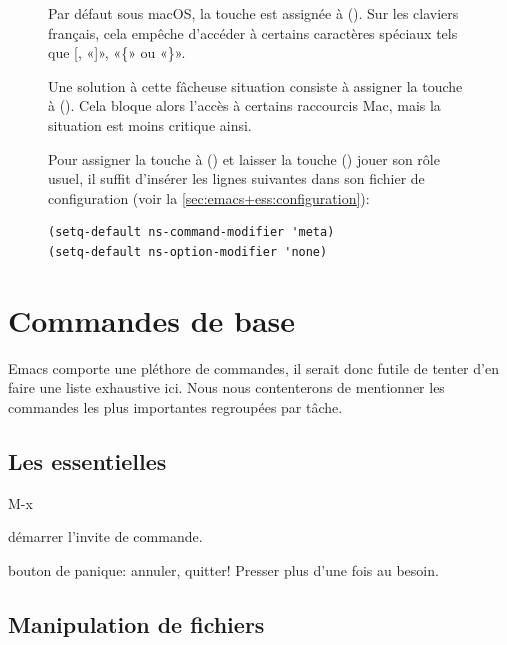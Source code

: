 \begin{figure}[t]
  \label{fig:ess:meta}
  \begin{osxblock}
    Par défaut sous macOS, la touche  est assignée à
     (\optkey). Sur les claviers français, cela empêche
    d'accéder à certains caractères spéciaux tels que {\og}[{\fg},
    «]», «\{» ou «\}».

    Une solution à cette fâcheuse situation consiste à assigner la
    touche  à  (\cmdkey). Cela bloque alors
    l'accès à certains raccourcis Mac, mais la situation est moins
    critique ainsi.

    Pour assigner la touche  à  (\cmdkey) et
    laisser la touche  (\optkey) jouer son rôle usuel, il
    suffit d'insérer les lignes suivantes dans son fichier de
    configuration  (voir la
    \autoref{sec:emacs+ess:configuration}):
\begin{verbatim}
(setq-default ns-command-modifier 'meta)
(setq-default ns-option-modifier 'none)
\end{verbatim}
    \vspace{-\baselineskip}
  \end{osxblock}
\end{figure}


\section{Commandes de base}
\label{sec:emacs+ess:commandes}

Emacs comporte une pléthore de commandes, il serait donc futile de
tenter d'en faire une liste exhaustive ici. Nous nous contenterons de
mentionner les commandes les plus importantes regroupées par tâche.

\subsection{Les essentielles}
\label{sec:emacs+ess:commandes:essentielles}

\begin{ttscript}{M-x}
\item[\code{M-x}] démarrer l'invite de commande.
\item[\code{C-g}] bouton de panique: annuler, quitter! Presser plus
  d'une fois au besoin.
\end{ttscript}

\subsection{Manipulation de fichiers}
\label{sec:emacs+ess:commandes:fichiers}

